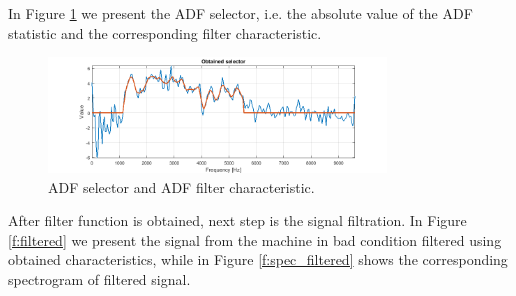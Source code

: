 \documentclass[11pt]{article}
\begin{document}
In Figure \ref{f:selector} we present the ADF selector, i.e. the absolute value of the ADF statistic and the corresponding filter characteristic.

\begin{figure}[!ht]
\begin{center}
\includegraphics[width=0.8\textwidth]{selector_3.png}
\caption{ADF selector and ADF filter characteristic.\label{f:selector}}
\end{center}
\end{figure}

After filter function is obtained, next step is the signal filtration. In Figure \ref{f:filtered} we present the signal from the machine in bad condition filtered using obtained characteristics, while in Figure \ref{f:spec_filtered} shows the corresponding spectrogram of filtered signal.
\end{document}
